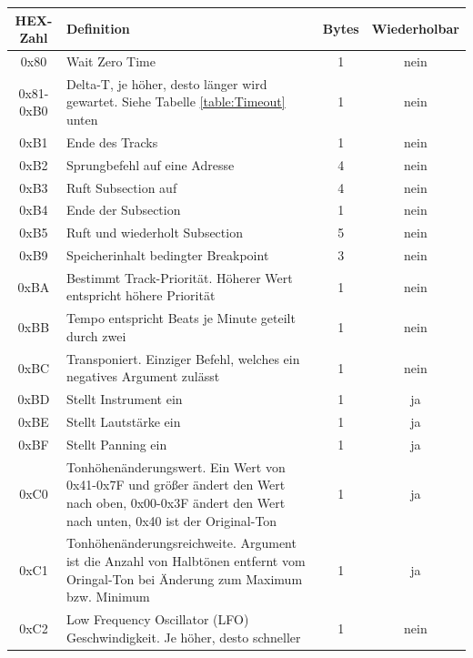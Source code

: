 \documentclass[11pt,a4paper]{scrartcl}
\begin{document}
\newpage
\begin{table}[!h]
    \centering
    \begin{tabular}{ c | p{11cm}| c | c}
        \textbf{HEX-Zahl} & \textbf{Definition} & \textbf{Bytes} & \textbf{Wiederholbar} \\
        \hline
        0x80 & Wait Zero Time & 1 & nein \\
        \hline
        0x81-0xB0 & Delta-T, je h\"oher, desto l\"anger wird gewartet. Siehe Tabelle \ref{table:Timeout} unten & 1 & nein \\
        \hline
        0xB1 & Ende des Tracks & 1 & nein \\
        \hline
        0xB2 & Sprungbefehl auf eine Adresse & 4 & nein \\
        \hline
        0xB3 & Ruft Subsection auf & 4 & nein \\
        \hline
        0xB4 & Ende der Subsection & 1 & nein \\
        \hline
        0xB5 & Ruft und wiederholt Subsection & 5 & nein \\
        \hline
        0xB9 & Speicherinhalt bedingter Breakpoint & 3 & nein \\
        \hline
        0xBA & Bestimmt Track-Priorit\"at. H\"oherer Wert entspricht h\"ohere Priorit\"at & 1 & nein \\
        \hline
        0xBB & Tempo entspricht Beats je Minute geteilt durch zwei & 1 & nein \\
        \hline
        0xBC & Transponiert. Einziger Befehl, welches ein negatives Argument zul\"asst & 1 & nein \\
        \hline
        0xBD & Stellt Instrument ein & 1 & ja \\
        \hline
        0xBE & Stellt Lautst\"arke ein & 1 & ja \\
        \hline
        0xBF & Stellt Panning ein & 1 & ja \\
        \hline
        0xC0 & Tonh\"ohen\"anderungswert. Ein Wert von 0x41-0x7F und gr\"o{\ss}er \"andert den Wert nach oben, 0x00-0x3F \"andert den Wert nach unten, 0x40 ist der Original-Ton & 1 & ja \\
        \hline
        0xC1 & Tonh\"ohen\"anderungsreichweite. Argument ist die Anzahl von Halbt\"onen entfernt vom Oringal-Ton bei \"Anderung zum Maximum bzw. Minimum& 1 & ja \\
        \hline
        0xC2 & Low Frequency Oscillator (LFO) Geschwindigkeit. Je h\"oher, desto schneller & 1 & nein \\

\end{tabular}
\end{table}
\end{document}
